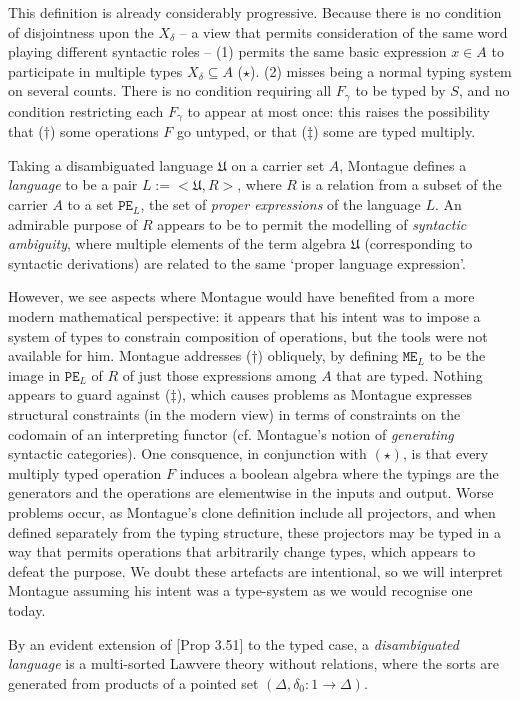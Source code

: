 This definition is already considerably progressive. Because there is no condition of disjointness upon the $X_\delta$ -- a view that permits consideration of the same word playing different syntactic roles -- (1) permits the same basic expression $x \in A$ to participate in multiple types $X_\delta \subseteq A$ ($\star$). (2) misses being a normal typing system on several counts. There is no condition requiring all $F_\gamma$ to be typed by $S$, and no condition restricting each $F_\gamma$ to appear at most once: this raises the possibility that ($\dag$) some operations $F$ go untyped, or that ($\ddag$) some are typed multiply.

Taking a disambiguated language $\mathfrak{U}$ on a carrier set $A$, Montague defines a \emph{language} to be a pair $L := <\mathfrak{U}, R>$, where $R$ is a relation from a subset of the carrier $A$ to a set $\texttt{PE}_L$, the set of \emph{proper expressions} of the language $L$. An admirable purpose of $R$ appears to be to permit the modelling of \emph{syntactic ambiguity}, where multiple elements of the term algebra $\mathfrak{U}$ (corresponding to syntactic derivations) are related to the same `proper language expression'.

However, we see aspects where Montague would have benefited from a more modern mathematical perspective: it appears that his intent was to impose a system of types to constrain composition of operations, but the tools were not available for him. Montague addresses ($\dag$) obliquely, by defining $\texttt{ME}_L$ to be the image in $\texttt{PE}_L$ of $R$ of just those expressions among $A$ that are typed. Nothing appears to guard against ($\ddag$), which causes problems as Montague expresses structural constraints (in the modern view) in terms of constraints on the codomain of an interpreting functor (cf. Montague's notion of \emph{generating} syntactic categories). One consquence, in conjunction with $(\star)$, is that every multiply typed operation $F$ induces a boolean algebra where the typings are the generators and the operations are elementwise in the inputs and output. Worse problems occur, as Montague's clone definition include all projectors, and when defined separately from the typing structure, these projectors may be typed in a way that permits operations that arbitrarily change types, which appears to defeat the purpose. We doubt these artefacts are intentional, so we will interpret Montague assuming his intent was a type-system as we would recognise one today.

By an evident extension of [Prop 3.51] to the typed case, a \emph{disambiguated language} is a multi-sorted Lawvere theory without relations, where the sorts are generated from products of a pointed set $(\Delta, \delta_0 : 1 \rightarrow \Delta)$.